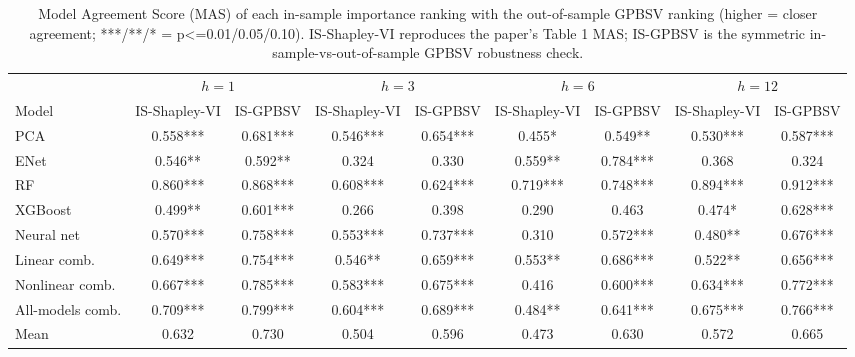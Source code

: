 \begin{table}[htbp]
\centering
\caption{Model Agreement Score (MAS) of each in-sample importance ranking with the out-of-sample GPBSV ranking (higher = closer agreement; ***/**/* = p<=0.01/0.05/0.10). IS-Shapley-VI reproduces the paper's Table 1 MAS; IS-GPBSV is the symmetric in-sample-vs-out-of-sample GPBSV robustness check.}
\label{tab:mas_isgpbsv}
\begin{tabular}{lcccccccc}
\toprule
 & \multicolumn{2}{c}{$h=1$} & \multicolumn{2}{c}{$h=3$} & \multicolumn{2}{c}{$h=6$} & \multicolumn{2}{c}{$h=12$} \\
\cmidrule(lr){2-3} \cmidrule(lr){4-5} \cmidrule(lr){6-7} \cmidrule(lr){8-9}
Model & IS-Shapley-VI & IS-GPBSV & IS-Shapley-VI & IS-GPBSV & IS-Shapley-VI & IS-GPBSV & IS-Shapley-VI & IS-GPBSV \\
\midrule
PCA & 0.558*** & 0.681*** & 0.546*** & 0.654*** & 0.455* & 0.549** & 0.530*** & 0.587*** \\
ENet & 0.546** & 0.592** & 0.324 & 0.330 & 0.559** & 0.784*** & 0.368 & 0.324 \\
RF & 0.860*** & 0.868*** & 0.608*** & 0.624*** & 0.719*** & 0.748*** & 0.894*** & 0.912*** \\
XGBoost & 0.499** & 0.601*** & 0.266 & 0.398 & 0.290 & 0.463 & 0.474* & 0.628*** \\
Neural net & 0.570*** & 0.758*** & 0.553*** & 0.737*** & 0.310 & 0.572*** & 0.480** & 0.676*** \\
Linear comb. & 0.649*** & 0.754*** & 0.546** & 0.659*** & 0.553** & 0.686*** & 0.522** & 0.656*** \\
Nonlinear comb. & 0.667*** & 0.785*** & 0.583*** & 0.675*** & 0.416 & 0.600*** & 0.634*** & 0.772*** \\
All-models comb. & 0.709*** & 0.799*** & 0.604*** & 0.689*** & 0.484** & 0.641*** & 0.675*** & 0.766*** \\
\midrule
Mean & 0.632 & 0.730 & 0.504 & 0.596 & 0.473 & 0.630 & 0.572 & 0.665 \\
\bottomrule
\end{tabular}
\end{table}